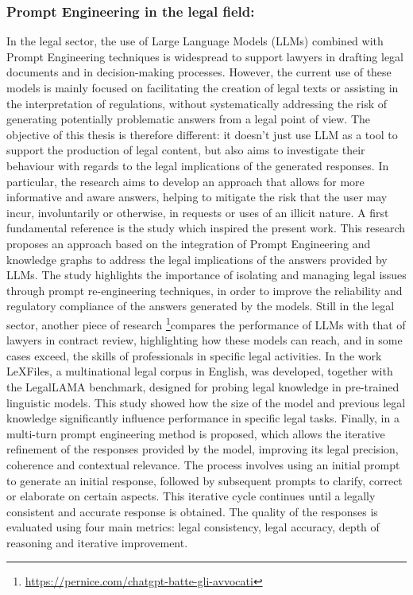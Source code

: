 \subsubsection{Prompt Engineering in the legal field:}
In the legal sector, the use of Large Language Models (LLMs) combined with Prompt Engineering techniques is widespread to support lawyers in drafting legal documents and in decision-making processes. However, the current use of these models is mainly focused on facilitating the creation of legal texts or assisting in the interpretation of regulations, without systematically addressing the risk of generating potentially problematic answers from a legal point of view.
The objective of this thesis is therefore different: it doesn't just use LLM as a tool to support the production of legal content, but also aims to investigate their behaviour with regards to the legal implications of the generated responses. In particular, the research aims to develop an approach that allows for more informative and aware answers, helping to mitigate the risk that the user may incur, involuntarily or otherwise, in requests or uses of an illicit nature.
A first fundamental reference is the study \cite{Damato}which inspired the present work. This research proposes an approach based on the integration of Prompt Engineering and knowledge graphs to address the legal implications of the answers provided by LLMs. The study highlights the importance of isolating and managing legal issues through prompt re-engineering techniques, in order to improve the reliability and regulatory compliance of the answers generated by the models.
Still in the legal sector, another piece of research \footnote{\url{https://pernice.com/chatgpt-batte-gli-avvocati}}compares the performance of LLMs with that of lawyers in contract review, highlighting how these models can reach, and in some cases exceed, the skills of professionals in specific legal activities.
In the work \cite{chalkidis2023lexfileslegallamafacilitatingenglish} LeXFiles, a multinational legal corpus in English, was developed, together with the LegalLAMA benchmark, designed for probing legal knowledge in pre-trained linguistic models. This study showed how the size of the model and previous legal knowledge significantly influence performance in specific legal tasks.
Finally, in \cite{cui2024chatlawmultiagentcollaborativelegal} a multi-turn prompt engineering method is proposed, which allows the iterative refinement of the responses provided by the model, improving its legal precision, coherence and contextual relevance. The process involves using an initial prompt to generate an initial response, followed by subsequent prompts to clarify, correct or elaborate on certain aspects. This iterative cycle continues until a legally consistent and accurate response is obtained. The quality of the responses is evaluated using four main metrics: legal consistency, legal accuracy, depth of reasoning and iterative improvement.



